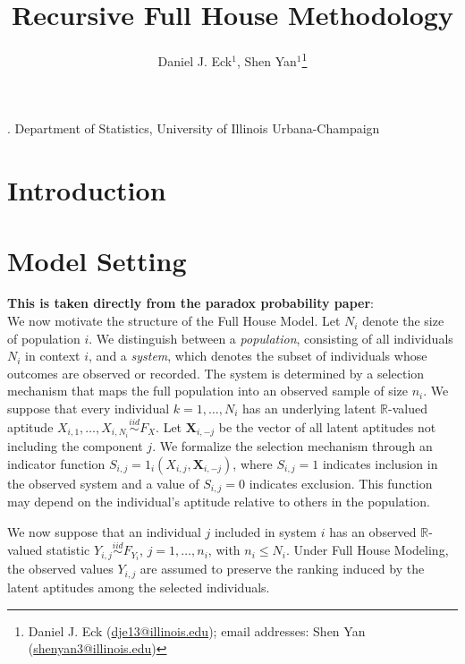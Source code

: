 \documentclass[12pt]{article}
\title{Recursive Full House Methodology}
\author{Daniel J. Eck$^1$, Shen Yan$^1$\thanks{Daniel J. Eck (\url{dje13@illinois.edu}); email addresses: Shen Yan (\url{shenyan3@illinois.edu})}}
\date{}
\newcommand{\R}{\mathbb{R}}
\begin{document}
\maketitle

{. Department of Statistics, University of Illinois Urbana-Champaign \\}


\begin{abstract}

\end{abstract}

\section{Introduction}




\section{Model Setting}
\label{sec:modelsetting}
\textbf{This is taken directly from the paradox probability paper}: \\

We now motivate the structure of the Full House Model.  Let $N_i$ denote the size of population $i$. We distinguish between a \emph{population}, consisting of all individuals $N_i$ in context $i$, and a \emph{system}, which denotes the subset of individuals whose outcomes are observed or recorded. The system is determined by a selection mechanism that maps the full population into an observed sample of size $n_i$. We suppose that every individual $k = 1,\ldots, N_i$ has an underlying latent $\R$-valued aptitude $X_{i,1}, \ldots, X_{i,N_i} \overset{iid}{\sim} F_{X}$. Let $\textbf{X}_{i,-j}$ be the vector of all latent aptitudes not including the component $j$. We formalize the selection mechanism through an indicator function $S_{i,j} = 1_{i}\left(X_{i,j},\textbf{X}_{i,-j}\right)$, where $S_{i,j} = 1$ indicates inclusion in the observed system and a value of $S_{i,j} = 0$ indicates exclusion. This function may depend on the individual's aptitude relative to others in the population.

We now suppose that an individual $j$ included in system $i$ has an observed $\R$-valued statistic $Y_{i,j} \overset{iid}{\sim} F_{Y_i}$, $j = 1,\ldots,n_i$, with $n_i \leq N_i$. Under Full House Modeling, the observed values $Y_{i,j}$ are assumed to preserve the ranking induced by the latent aptitudes among the selected individuals.
\end{document}
